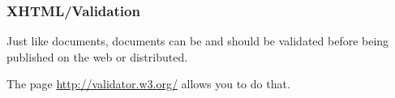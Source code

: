 %
\begin{frame}
\frametitle{XHTML/Validation}

Just like \XML documents, \XHTML documents can be and should be
validated before being published on the web or distributed.

\bigskip

The page \url{http://validator.w3.org/} allows you to do that.

\end{frame}
